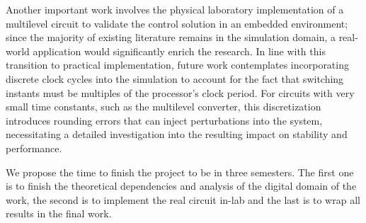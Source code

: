 Another important work involves the physical laboratory implementation of a multilevel circuit to 
validate the control solution in an embedded environment; since the majority of existing 
literature remains in the simulation domain, a real-world application would significantly enrich 
the research. In line with this transition to practical implementation, future work contemplates 
incorporating discrete clock cycles into the simulation to account for the fact that switching 
instants must be multiples of the processor's clock period. For circuits with very small time 
constants, such as the multilevel converter, this discretization introduces rounding errors that 
can inject perturbations into the system, necessitating a detailed investigation into the 
resulting impact on stability and performance.

We propose the time to finish the project to be in three semesters. The first one is to 
finish the theoretical dependencies and analysis of the digital domain of the work, the 
second is to implement the real circuit in-lab and the last is to wrap all results in 
the final work.